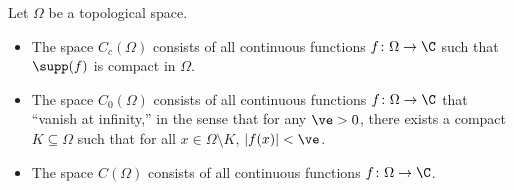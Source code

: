 \begin{definition}
  Let $\Omega$ be a topological space.
  \begin{itemize}
    \item The space $C_c\left( \Omega \right)$ consists of all continuous functions $f\colon \Omega\rightarrow \C$ such that $\supp(f)$ is compact in $\Omega$.
    \item The space $C_0\left( \Omega \right)$ consists of all continuous functions $f\colon \Omega\rightarrow \C$ that ``vanish at infinity,'' in the sense that for any $\ve > 0$, there exists a compact $K\subseteq \Omega$ such that for all $x\in \Omega\setminus K$, $\left\vert f(x) \right\vert < \ve$.
    \item The space $C\left( \Omega \right)$ consists of all continuous functions $f\colon \Omega\rightarrow \C$.
  \end{itemize}
\end{definition}
